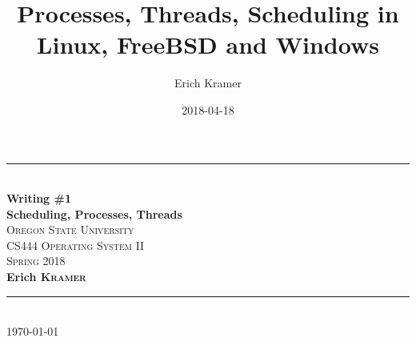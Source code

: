 \documentclass[letterpaper,10pt,notitlepage,fleqn]{article}
\title{Processes, Threads, Scheduling in Linux, FreeBSD and Windows}
\date{2018-04-18}
\author{Erich Kramer}
\begin{document}
\begin{titlepage}
\vspace*{\fill}

\newcommand{\HRule}{\rule{\linewidth}{0.5mm}} %

\center %


\HRule \\[0.4cm]
{ \huge \bfseries Writing \#1 \\Scheduling, Processes, Threads}\\[0.4cm] %


\textsc{\Large Oregon State University}\\[0.5cm] %
\textsc{\Large CS444 Operating System II}\\[0.5cm] %
\textsc{\large Spring 2018}\\[0.5cm] %
        \noindent \textbf{Erich \textsc{Kramer}} \\ %

\HRule \\[1.5cm]

{\large \today}\\[3cm] %




\vfill %



\end{titlepage}
\end{document}
